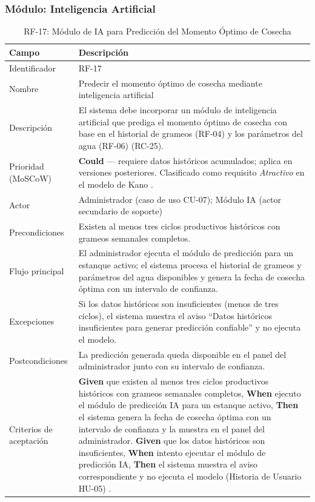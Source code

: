 \documentclass[12pt,a4paper]{article}
\begin{document}
\subsubsection{Módulo: Inteligencia Artificial}

\begin{table}[H]
\centering
\caption{RF-17: Módulo de IA para Predicción del Momento Óptimo de Cosecha}
\begin{tabular}{|p{3.6cm}|p{10.4cm}|}
\hline
\textbf{Campo} & \textbf{Descripción} \\
\hline
Identificador & RF-17 \\ \hline
Nombre & Predecir el momento óptimo de cosecha mediante inteligencia
artificial \\ \hline
Descripción & El sistema debe incorporar un módulo de inteligencia artificial
que prediga el momento óptimo de cosecha con base en el historial de grameos
(RF-04) y los parámetros del agua (RF-06) (RC-25). \\ \hline
Prioridad (MoSCoW) & \textbf{Could} --- requiere datos históricos acumulados;
aplica en versiones posteriores. Clasificado como requisito
\textit{Atractivo} en el modelo de Kano \cite{Pohl2010}. \\ \hline
Actor & Administrador (caso de uso CU-07); Módulo IA (actor secundario de
soporte) \\ \hline
Precondiciones & Existen al menos tres ciclos productivos históricos con
grameos semanales completos. \\ \hline
Flujo principal & El administrador ejecuta el módulo de predicción para un
estanque activo; el sistema procesa el historial de grameos y parámetros del
agua disponibles y genera la fecha de cosecha óptima con un intervalo de
confianza. \\ \hline
Excepciones & Si los datos históricos son insuficientes (menos de tres
ciclos), el sistema muestra el aviso ``Datos históricos insuficientes para
generar predicción confiable'' y no ejecuta el modelo. \\ \hline
Postcondiciones & La predicción generada queda disponible en el panel del
administrador junto con su intervalo de confianza. \\ \hline
Criterios de aceptación &
\textbf{Given} que existen al menos tres ciclos productivos históricos con
grameos semanales completos,
\textbf{When} ejecuto el módulo de predicción IA para un estanque activo,
\textbf{Then} el sistema genera la fecha de cosecha óptima con un intervalo de
confianza y la muestra en el panel del administrador.
\textbf{Given} que los datos históricos son insuficientes,
\textbf{When} intento ejecutar el módulo de predicción IA,
\textbf{Then} el sistema muestra el aviso correspondiente y no ejecuta el
modelo (Historia de Usuario HU-05) \cite{Cohn2004}. \\ \hline
\end{tabular}
\end{table}
\end{document}
